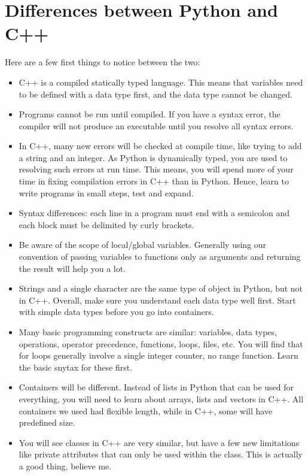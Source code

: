 \documentclass[letterpaper,10pt,english]{sphinxmanual}
\begin{document}
\section{Differences between Python and C++}
\label{\detokenize{lecture_notes/transition:differences-between-python-and-c}}
Here are a few first things to notice between the two:
\begin{itemize}
\item {} 
C++ is a compiled statically typed language. This means that
variables need to be defined with a data type first, and the data
type cannot be changed.

\item {} 
Programs cannot be run until compiled. If you have a syntax error,
the compiler will not produce an executable until you resolve all
syntax errors.

\item {} 
In C++, many new errors will be checked at compile time, like trying
to add a string and an integer. As Python is dynamically typed, you
are used to resolving such errors at run time. This means, you will
spend more of your time in fixing compilation errors in C++ than in
Python. Hence, learn to write programs in small steps, test and
expand.

\item {} 
Syntax differences: each line in a program must end with a semicolon
and each block must be delimited by curly brackets.

\item {} 
Be aware of the scope of local/global variables. Generally using our
convention of passing variables to functions only as arguments and
returning the result will help you a lot.

\item {} 
Strings and a single character are the same type of object in
Python, but not in C++. Overall, make sure you understand each data
type well first. Start with simple data types before you go into
containers.

\item {} 
Many basic programming constructs are similar: variables, data
types, operations, operator precedence, functions, loops, files,
etc. You will find that for loops generally involve a single integer
counter, no range function. Learn the basic snytax for these first.

\item {} 
Containers will be different. Instead of lists in Python that can be
used for everything, you will need to learn about arrays, lists and
vectors in C++. All containers we used had flexible length, while in
C++, some will have predefined size.

\item {} 
You will see classes in C++ are very similar, but have a few new
limitations like private attributes that can only be used within the
class. This is actually a good thing, believe me.

\end{itemize}
\end{document}
